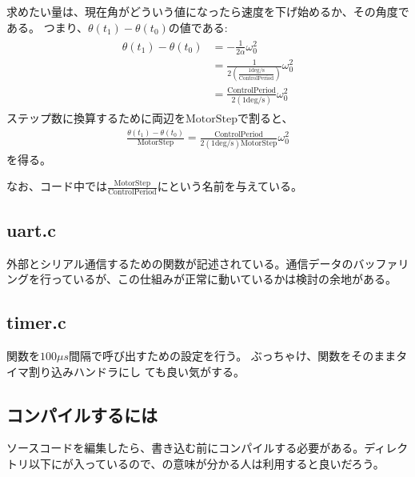 \documentclass[letterpaper,10pt,dvipdfmx]{sphinxmanual}
\begin{document}
求めたい量は、現在角がどういう値になったら速度を下げ始めるか、その角度である。
つまり、\(\theta(t_1)-\theta(t_0)\)の値である:
\begin{equation*}
\begin{split}\begin{aligned}
\theta(t_1)-\theta(t_0)&=-\frac{1}{2\alpha}\omega_0^2 \\
&=\frac{1}{2\left(\frac{1 \mathrm{deg/s}}{\mathrm{ControlPeriod}}\right)}\omega_0^2 \\
&=\frac{\mathrm{ControlPeriod}}{2(1 \mathrm{deg/s})}\omega_0^2\end{aligned}
\end{split}
\end{equation*}
ステップ数に換算するために両辺を\(\mathrm{MotorStep}\)で割ると、
\begin{equation*}
\begin{split}\frac{\theta(t_1)-\theta(t_0)}{\mathrm{MotorStep}}
=\frac{\mathrm{ControlPeriod}}{2(1 \mathrm{deg/s})\mathrm{MotorStep}}\omega_0^2
\end{split}
\end{equation*}
を得る。

なお、コード中では\(\frac{\mathrm{MotorStep}}{\mathrm{ControlPeriod}}\)にという名前を与えている。


\subsection{uart.c}
\label{\detokenize{nissyu-idohen/saitama:uart-c}}
外部とシリアル通信するための関数が記述されている。通信データのバッファリングを行っているが、この仕組みが正常に動いているかは検討の余地がある。


\subsection{timer.c}
\label{\detokenize{nissyu-idohen/saitama:timer-c}}
関数を\(100\mu s\)間隔で呼び出すための設定を行う。
ぶっちゃけ、関数をそのままタイマ割り込みハンドラにし
ても良い気がする。


\subsection{コンパイルするには}
\label{\detokenize{nissyu-idohen/saitama:}}\label{\detokenize{nissyu-idohen/saitama:id7}}
ソースコードを編集したら、書き込む前にコンパイルする必要がある。ディレクトリ以下にが入っているので、の意味が分かる人は利用すると良いだろう。
\end{document}
